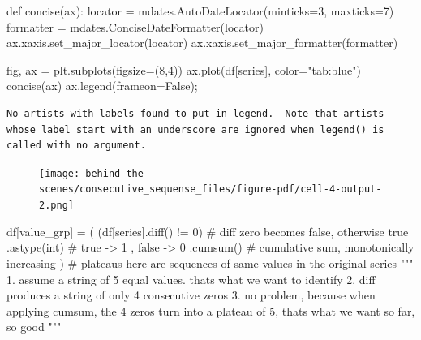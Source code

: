 \documentclass[
  letterpaper,
  DIV=11,
  numbers=noendperiod,
  oneside]{scrreprt}
\newenvironment{Shaded}{\begin{snugshade}}{\end{snugshade}}
\newcommand{\CommentTok}[1]{\textcolor[rgb]{0.37,0.37,0.37}{#1}}
\newcommand{\DecValTok}[1]{\textcolor[rgb]{0.68,0.00,0.00}{#1}}
\newcommand{\KeywordTok}[1]{\textcolor[rgb]{0.00,0.23,0.31}{#1}}
\newcommand{\NormalTok}[1]{\textcolor[rgb]{0.00,0.23,0.31}{#1}}
\newcommand{\OperatorTok}[1]{\textcolor[rgb]{0.37,0.37,0.37}{#1}}
\newcommand{\StringTok}[1]{\textcolor[rgb]{0.13,0.47,0.30}{#1}}
\newcommand{\VariableTok}[1]{\textcolor[rgb]{0.07,0.07,0.07}{#1}}
\begin{document}
\begin{Shaded}
\begin{Highlighting}[]
\KeywordTok{def}\NormalTok{ concise(ax):}
\NormalTok{    locator }\OperatorTok{=}\NormalTok{ mdates.AutoDateLocator(minticks}\OperatorTok{=}\DecValTok{3}\NormalTok{, maxticks}\OperatorTok{=}\DecValTok{7}\NormalTok{)}
\NormalTok{    formatter }\OperatorTok{=}\NormalTok{ mdates.ConciseDateFormatter(locator)}
\NormalTok{    ax.xaxis.set\_major\_locator(locator)}
\NormalTok{    ax.xaxis.set\_major\_formatter(formatter)}

\NormalTok{fig, ax }\OperatorTok{=}\NormalTok{ plt.subplots(figsize}\OperatorTok{=}\NormalTok{(}\DecValTok{8}\NormalTok{,}\DecValTok{4}\NormalTok{))}
\NormalTok{ax.plot(df[}\StringTok{\textquotesingle{}series\textquotesingle{}}\NormalTok{], color}\OperatorTok{=}\StringTok{"tab:blue"}\NormalTok{)}
\NormalTok{concise(ax)}
\NormalTok{ax.legend(frameon}\OperatorTok{=}\VariableTok{False}\NormalTok{)}\OperatorTok{;}
\end{Highlighting}
\end{Shaded}

\begin{verbatim}
No artists with labels found to put in legend.  Note that artists whose label start with an underscore are ignored when legend() is called with no argument.
\end{verbatim}

\begin{figure}[H]

{\centering \texttt{[image: behind-the-scenes/consecutive\_sequense\_files/figure-pdf/cell-4-output-2.png]}

}

\end{figure}

\begin{Shaded}
\begin{Highlighting}[]
\NormalTok{df[}\StringTok{\textquotesingle{}value\_grp\textquotesingle{}}\NormalTok{] }\OperatorTok{=}\NormalTok{ (}
\NormalTok{                   (df[}\StringTok{\textquotesingle{}series\textquotesingle{}}\NormalTok{].diff() }\OperatorTok{!=} \DecValTok{0}\NormalTok{)  }\CommentTok{\# diff zero becomes false, otherwise true}
\NormalTok{                      .astype(}\StringTok{\textquotesingle{}int\textquotesingle{}}\NormalTok{)           }\CommentTok{\# true {-}\textgreater{} 1  , false {-}\textgreater{} 0}
\NormalTok{                      .cumsum()                }\CommentTok{\# cumulative sum, monotonically increasing}
\NormalTok{                  )                            }\CommentTok{\# plateaus here are sequences of same values in the original series}
\CommentTok{"""}
\CommentTok{1. assume a string of 5 equal values. that\textquotesingle{}s what we want to identify}
\CommentTok{2. diff produces a string of only 4 consecutive zeros}
\CommentTok{3. no problem, because when applying cumsum, the 4 zeros turn into a plateau of 5, that\textquotesingle{}s what we want}
\CommentTok{so far, so good}
\CommentTok{"""}
\end{Highlighting}
\end{Shaded}
\end{document}
